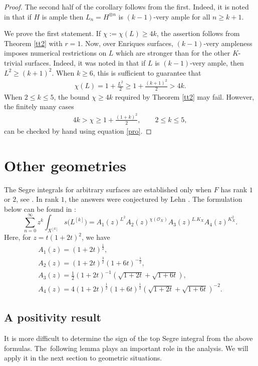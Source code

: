 \documentclass[10pt,a4paper]{amsart}
\numberwithin{equation}{section}
\begin{document}
\begin{proof} The second half of the corollary follows from the first. Indeed, it is noted in \cite[Proposition $2.5$]{S} that if $H$ is ample then $L_n=H^{\otimes n}$ is $(k-1)$-very ample for all $n\geq k+1$.

We prove the first statement. If $\chi:=\chi(L)\geq 4k$, the assertion follows from Theorem \ref{tt2} with $r=1$. Now, over Enriques surfaces, $(k-1)$-very ampleness imposes numerical restrictions on $L$ which are stronger than for the other $K$-trivial surfaces. Indeed, it was noted in \cite[Theorem~2.4]{S} that if $L$ is $(k-1)$-very ample, then $L^2\geq (k+1)^2$.
When $k\geq 6$, this is sufficient to guarantee that
\begin{gather*}
\chi(L)=1+\frac{L^2}{2}\geq 1+\frac{(k+1)^2}{2}>4k.
\end{gather*}
When $2\leq k\leq 5$, the bound $\chi\geq 4k$ required by Theorem \ref{tt2} may fail. However, the finitely many cases
\begin{gather*}
4k>\chi\geq 1+ \frac{(1+k)^2}{2}, \qquad 2\leq k\leq 5,
\end{gather*}
can be checked by hand using equation \eqref{pro}.
\end{proof}

\section{Other geometries} \label{secother}
The Segre integrals for arbitrary surfaces are established only when $F$ has rank $1$ or $2$, see \cite{MOP1, MOP}. In rank $1$, the answers were conjectured by Lehn \cite{Le}. The formulation below can be found in \cite{MOP}:
\begin{equation}\label{lehnc}
\sum_{n=0}^{\infty} z^k \int_{X^{[k]}} s\big(L^{[k]}\big) = A_1 (z)^{L^2} A_2(z)^{\chi(\mathcal O_X)} A_3 (z)^{L.K_X} A_4(z)^{K_X^2}.
\end{equation}
Here, for $z=t(1+2t)^2$, we have
\begin{gather*}
A_1(z)=(1+2t)^{\frac{1}{2}},
\\
A_2(z)=(1+2t)^{\frac{3}{2}} (1+6t)^{-\frac{1}{2}},
\\
A_3(z)=\frac{1}{2} (1+2t)^{-1} \left(\sqrt{1+2t}+\sqrt{1+6t}\right),
\\
 A_4(z)=4 (1+2t)^{\frac{1}{2}} (1+6t)^{\frac{1}{2}} \left(\sqrt{1+2t}+\sqrt{1+6t}\right)^{-2}.
 \end{gather*}

\subsection{A positivity result} It is more difficult to determine the sign of the top Segre integral from the above formulas. The~following lemma plays an important role in the analysis. We will apply it in the next section to geometric situations.
\end{document}
